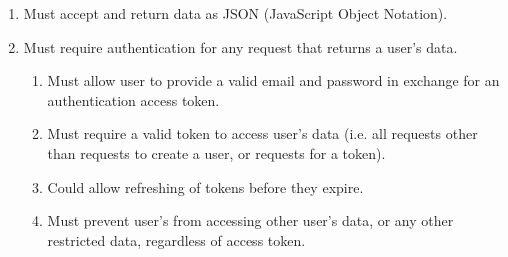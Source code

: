 \documentclass[11pt,openright,a4paper]{report}
\begin{document}
\begin{enumerate}
\item Must accept and return data as JSON (JavaScript Object Notation).
\item Must require authentication for any request that returns a user's data.
  \begin{enumerate}
  \item Must allow user to provide a valid email and password in exchange for an authentication access token.
  \item Must require a valid token to access user's data (i.e. all requests other than requests to create a user, or requests for a token).
  \item Could allow refreshing of tokens before they expire.
  \item Must prevent user's from accessing other user's data, or any other restricted data, regardless of access token.
  \end{enumerate}
\end{enumerate}
\end{document}
